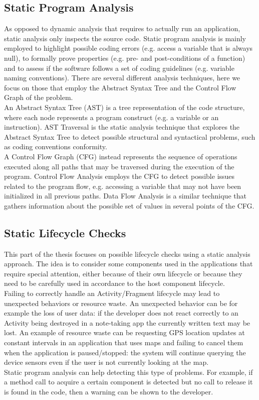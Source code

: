 \documentclass[11pt,a4paper,notitlepage]{article}
\begin{document}
\subsection{Static Program Analysis}
As opposed to dynamic analysis that requires to actually run an application, static analysis only inspects the source code. Static program analysis is mainly employed to highlight possible coding errors (e.g. access a variable that is always null), to formally prove properties (e.g. pre- and post-conditions of a function) and to assess if the software follows a set of coding guidelines (e.g. variable naming conventions). There are several different analysis techniques, here we focus on those that employ the Abstract Syntax Tree and the Control Flow Graph of the problem.\medskip \\
An Abstract Syntax Tree (AST) is a tree representation of the code structure, where each node represents a program construct (e.g. a variable or an instruction). AST Traversal is the static analysis technique that explores the Abstract Syntax Tree to detect possible structural and syntactical problems, such as coding conventions conformity.\medskip \\
A Control Flow Graph (CFG) instead represents the sequence of operations executed along all paths that may be traversed during the execution of the program. Control Flow Analysis employs the CFG to detect possible issues related to the program flow, e.g. accessing a variable that may not have been initialized in all previous paths. Data Flow Analysis is a similar technique that gathers information about the possible set of values in several points of the CFG.

\subsection{Static Lifecycle Checks}
This part of the thesis focuses on possible lifecycle checks using a static analysis approach. The idea is to consider some components used in the applications that require special attention, either because of their own lifecycle or because they need to be carefully used in accordance to the host component lifecycle.\medskip \\
Failing to correctly handle an Activity/Fragment lifecycle may lead to unexpected behaviors or resource waste. An unexpected behavior can be for example the loss of user data: if the developer does not react correctly to an Activity being destroyed in a note-taking app the currently written text may be lost. An example of resource waste can be requesting GPS location updates at constant intervals in an application that uses maps and failing to cancel them when the application is paused/stopped: the system will continue querying the device sensors even if the user is not currently looking at the map.\medskip \\
Static program analysis can help detecting this type of problems. For example, if a method call to acquire a certain component is detected but no call to release it is found in the code, then a warning can be shown to the developer.
\end{document}
